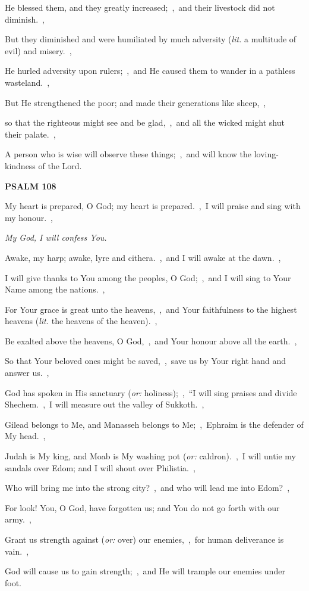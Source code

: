 \documentclass[12pt,twoside,a5paper]{article}
\newcommand{\psalm}[1]{\textbf{PSALM {#1}}\nopagebreak}
\newcommand{\qanona}[1]{{\liturgicalhint{Qanona.} \emph{#1}}}
\newcommand{\translationoption}[1]{\emph{or:} #1}
\newcommand{\translationliteral}[1]{\emph{lit.} #1}
\begin{document}
\begin{normalparskip}
  He blessed them, and they greatly increased;~\sep\ and their livestock did not diminish.~\sep

  But they diminished and were humiliated by much adversity (\translationliteral{a multitude of evil}) and misery.~\sep

  He hurled adversity upon rulers;~\sep\ and He caused them to wander in a pathless wasteland.~\sep

  But He strengthened the poor; and made their generations like sheep,~\sep

  so that the righteous might see and be glad,~\sep\ and all the wicked might shut their palate.~\sep

  A person who is wise will observe these things;~\sep\ and will know the loving-kindness of the Lord.
\end{normalparskip}

\psalm{108}

\begin{normalparskip}
  My heart is prepared, O God; my heart is prepared.~\sep\ I will praise and sing with my honour.~\sep

  \qanona{My God, I will confess You.}

  Awake, my harp; awake, lyre and cithera.~\sep\ and I will awake at the dawn.~\sep

  I will give thanks to You among the peoples, O God;~\sep\ and I will sing to Your Name among the nations.~\sep

  For Your grace is great unto the heavens,~\sep\ and Your faithfulness to the highest heavens (\translationliteral{the heavens of the heaven}).~\sep

  Be exalted above the heavens, O God,~\sep\ and Your honour above all the earth.~\sep

  So that Your beloved ones might be saved,~\sep\ save us by Your right hand and answer us.~\sep

  God has spoken in His sanctuary (\translationoption{holiness});~\sep\ ``I will sing praises and divide Shechem.~\sep\ I will measure out the valley of Sukkoth.~\sep

  Gilead belongs to Me, and Manasseh belongs to Me;~\sep\ Ephraim is the defender of My head.~\sep

  Judah is My king, and Moab is My washing pot (\translationoption{caldron}).~\sep\ I will untie my sandals over Edom; and I will shout over Philistia.~\sep

  Who will bring me into the strong city?~\sep\ and who will lead me into Edom?~\sep

  For look! You, O God, have forgotten us; and You do not go forth with our army.~\sep

  Grant us strength against (\translationoption{over}) our enemies,~\sep\ for human deliverance is vain.~\sep

  God will cause us to gain strength;~\sep\ and He will trample our enemies under foot.
\end{normalparskip}
\end{document}
